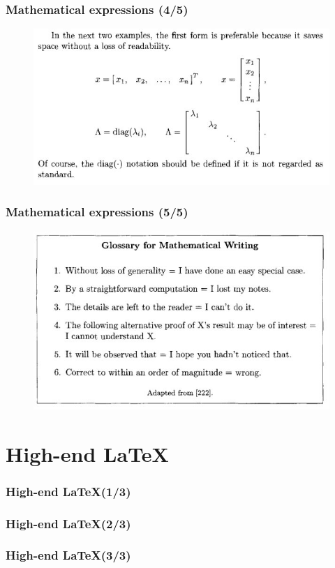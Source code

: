 \documentclass{beamer}
\begin{document}
\begin{frame}
\frametitle{Mathematical expressions (4/5)}
\begin{figure}[t]
 \includegraphics[width=\textwidth]{images/space.jpeg}
\end{figure}
\end{frame}
\begin{frame}
\frametitle{Mathematical expressions (5/5)}
\begin{figure}[t]
 \includegraphics[width=\textwidth]{images/math.jpeg}
\end{figure}
\end{frame}


\section{High-end \LaTeX}
\begin{frame}
\frametitle{High-end \LaTeX (1/3)}
\end{frame}
\begin{frame}
\frametitle{High-end \LaTeX (2/3)}
\end{frame}
\begin{frame}
\frametitle{High-end \LaTeX (3/3)}
\end{frame}
\end{document}
